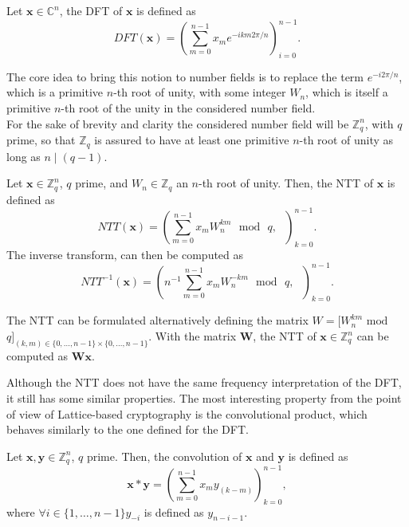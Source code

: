 \begin{definition}
Let $\mathbf{x}\in\mathbb{C}^n$, the DFT of $\mathbf{x}$ is defined as
\begin{equation*}
DFT(\mathbf{x})=\left(\sum_{m=0}^{n-1}x_me^{-ikm2\pi/n} \right)_{i=0}^{n-1}.
\end{equation*}
\end{definition}

The core idea to bring this notion to number fields is to replace the term $e^{-i2\pi/n}$, which is a primitive $n$-th root of unity, with some integer $W_n$, which is itself a primitive $n$-th root of the unity in the considered number field.\\
For the sake of brevity and clarity the considered number field will be $\mathbb{Z}_q^n$, with $q$ prime, so that $\mathbb{Z}_q$ is assured to have at least one primitive $n$-th root of unity as long as $n\mid(q-1)$.

\begin{definition}[NTT]
Let $\mathbf{x}\in\mathbb{Z}_q^n$, $q$ prime, and $W_n\in\mathbb{Z}_q$ an $n$-th root of unity. Then, the NTT of $\mathbf{x}$ is defined as
\begin{equation*}
NTT(\mathbf{x})=\left(\sum_{m=0}^{n-1}x_mW_n^{km}\text{ }\mathrm{mod}\text{ }q,\text{ }\right)_{k=0}^{n-1}.
\end{equation*}
The inverse transform, can then be computed as
\begin{equation*}
NTT^{-1}(\mathbf{x})=\left(n^{-1}\sum_{m=0}^{n-1}x_mW_n^{-km}\text{ }\mathrm{mod}\text{ }q,\text{ }\right)_{k=0}^{n-1}.
\end{equation*} 
\end{definition}

\begin{remark}
The NTT can be formulated alternatively defining the matrix $W=[W_n^{km}$ $\mathrm{mod}$ $q]_{(k,m)\in\{0,\ldots,n-1\}\times\{0,\ldots,n-1\}}$. With the matrix $\mathbf{W}$, the NTT of $\mathbf{x}\in\mathbb{Z}_q^n$ can be computed as $\mathbf{Wx}$.
\end{remark}

Although the NTT does not have the same frequency interpretation of the DFT, it still has some similar properties. The most interesting property from the point of view of Lattice-based cryptography is the convolutional product, which behaves similarly to the one defined for the DFT.

\begin{definition}
Let $\mathbf{x},\mathbf{y}\in\mathbb{Z}_q^n$, $q$ prime. Then, the convolution of $\mathbf{x}$ and $\mathbf{y}$ is defined as
\begin{equation*}
\mathbf{x}\ast\mathbf{y} = \left(\sum_{m=0}^{n-1}x_{m}y_{(k-m)}\right)_{k=0}^{n-1},
\end{equation*}
where $\forall i \in \{1,\ldots,n-1\} y_{-i}$ is defined as $y_{n-i-1}$. 
\end{definition}

